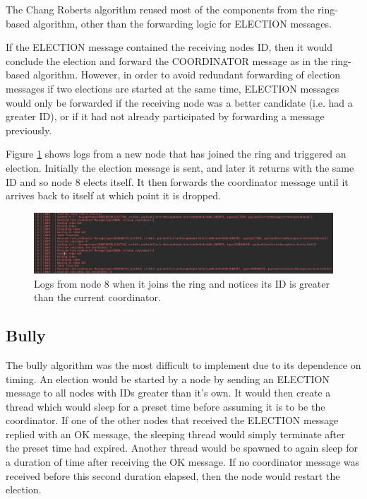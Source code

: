\documentclass[12pt]{article}
\begin{document}
The Chang Roberts algorithm reused most of the components from the ring-based algorithm, other than the forwarding logic for ELECTION messages. 

If the ELECTION message contained the receiving nodes ID, then it would conclude the election and forward the COORDINATOR message as in the ring-based algorithm. However, in order to avoid redundant forwarding of election messages if two elections are started at the same time, ELECTION messages would only be forwarded if the receiving node was a better candidate (i.e. had a greater ID), or if it had not already participated by forwarding a message previously.

Figure \ref{fig:chang} shows logs from a new node that has joined the ring and triggered an election. Initially the election message is sent, and later it returns with the same ID and so node 8 elects itself. It then forwards the coordinator message until it arrives back to itself at which point it is dropped.

\begin{figure}[!ht]
	\centering
	\includegraphics[width=\linewidth]{images/chang}
	\caption{Logs from node 8 when it joins the ring and notices its ID is greater than the current coordinator.}
	\label{fig:chang}
\end{figure}

\subsection{Bully}

The bully algorithm was the most difficult to implement due to its dependence on timing. An election would be started by a node by sending an ELECTION message to all nodes with IDs greater than it's own. It would then create a thread which would sleep for a preset time before assuming it is to be the coordinator. If one of the other nodes that received the ELECTION message replied with an OK message, the sleeping thread would simply terminate after the preset time had expired. Another thread would be spawned to again sleep for a duration of time after receiving the OK message. If no coordinator message was received before this second duration elapsed, then the node would restart the election.
\end{document}
